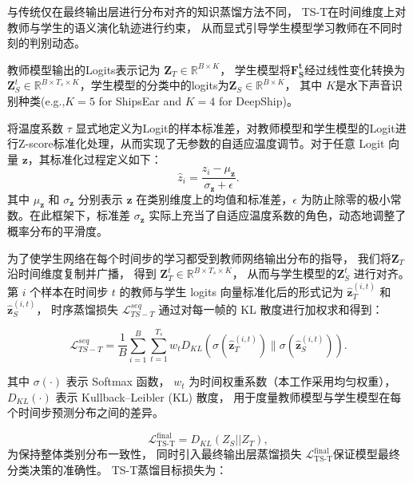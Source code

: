 \documentclass[a4paper, 12pt]{article}
\begin{document}
与传统仅在最终输出层进行分布对齐的知识蒸馏方法不同，
TS-T在时间维度上对教师与学生的语义演化轨迹进行约束，
从而显式引导学生模型学习教师在不同时刻的判别动态。

教师模型输出的Logits表示记为
$\mathbf{Z}_{T} \in \mathbb{R}^{B\times K}$，
学生模型将$\mathbf{F_S^t}$经过线性变化转换为
$\mathbf{Z}^{t}_S \in \mathbb{R}^{B \times T_s \times K}$，学生模型的分类中的logits为$\mathbf{Z}_S \in \mathbb{R}^{B \times K}$，
其中 $K$是水下声音识别种类(e.g.,$K=5$ for ShipsEar and $K=4$ for DeepShip)。


将温度系数 $\tau$ 显式地定义为Logit的样本标准差，对教师模型和学生模型的Logit进行Z-score标准化处理，从而实现了无参数的自适应温度调节。对于任意 Logit 向量 $\mathbf{z}$，其标准化过程定义如下：\begin{equation}
\hat{z}_i = \frac{z_i - \mu_\mathbf{z}}{\sigma_\mathbf{z} + \epsilon}.
\end{equation}其中 $\mu_\mathbf{z}$ 和 $\sigma_\mathbf{z}$ 分别表示 $\mathbf{z}$ 在类别维度上的均值和标准差，$\epsilon$ 为防止除零的极小常数。在此框架下，标准差 $\sigma_\mathbf{z}$ 实际上充当了自适应温度系数的角色，动态地调整了概率分布的平滑度。


为了使学生网络在每个时间步的学习都受到教师网络输出分布的指导，
我们将$\mathbf{Z}_{T}$ 沿时间维度复制并广播，
得到 $\mathbf{Z}_{T}^{t} \in \mathbb{R}^{B \times T_s \times K}$，
从而与学生模型的$\mathbf{Z}_S^{t}$ 进行对齐。
第 $i$ 个样本在时间步 $t$ 的教师与学生 logits 向量标准化后的形式记为
$\hat{\mathbf{z}}_T^{(i,t)}$ 和 $\hat{\mathbf{z}}_S^{(i,t)}$，
时序蒸馏损失 $\mathcal{L}_{TS-T}^{seq}$ 通过对每一帧的
KL 散度进行加权求和得到：

\begin{equation}
\mathcal{L}_{TS-T}^{seq}
=
\frac{1}{B}
\sum_{i=1}^{B}
\sum_{t=1}^{T_s}
w_t
D_{KL}
\left(
\sigma(\hat{\mathbf{z}}_{T}^{(i,t)})
\|
\sigma(\hat{\mathbf{z}}_{S}^{(i,t)})
\right).
\end{equation}

其中 $\sigma(\cdot)$ 表示 Softmax 函数，
$w_t$ 为时间权重系数（本工作采用均匀权重），
$D_{KL}(\cdot)$ 表示 Kullback–Leibler (KL) 散度，
用于度量教师模型与学生模型在每个时间步预测分布之间的差异。

\begin{equation}
    \mathcal{L}_{\text{TS-T}}^{\text{final}}= D_{KL}(Z_S || Z_T),
\end{equation}
为保持整体类别分布一致性，
同时引入最终输出层蒸馏损失
$\mathcal{L}_{\text{TS-T}}^{\text{final}}$保证模型最终分类决策的准确性。
TS-T蒸馏目标损失为：
\end{document}

